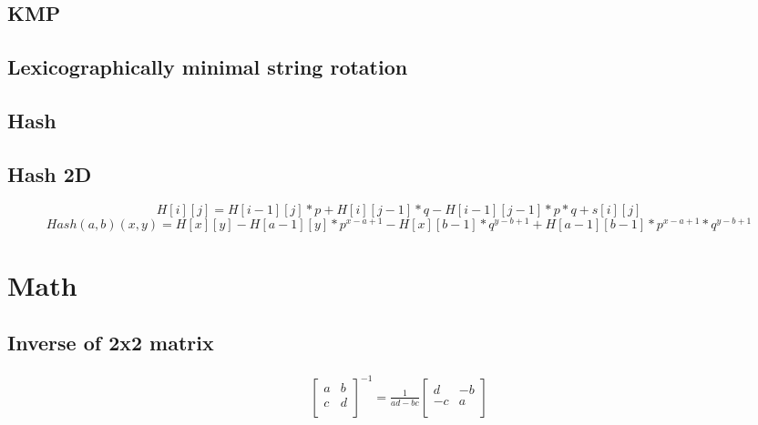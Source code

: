 \documentclass[a4paper, 12pt, oneside, landscape]{article}
\begin{document}
\begin{multicols}{2}
	\subsection{KMP}
	
	
	\subsection{Lexicographically minimal string rotation}
	
	
	\subsection{Hash}
	
	
	\subsection{Hash 2D}
	\begin{dmath}
	H[i][j] = H[i - 1][j] * p + H[i][j - 1] * q - H[i - 1][j - 1] * p * q + s[i][j]
	\end{dmath}
	\begin{dmath}
	Hash(a,b)(x,y) = H[x][y] - H[a - 1][y]*p^{x - a + 1} - H[x][b - 1]*q^{y - b + 1} + H[a - 1][b - 1] * p^{x - a + 1} * q^{y - b + 1}
	\end{dmath}

\section{Math}	
    \subsection{Inverse of 2x2 matrix}
    \begin{align*}
        \begin{bmatrix}
        a & b \\
        c & d \\
        \end{bmatrix} ^ {-1} = \frac{1}{ad - bc}
        \begin{bmatrix}
            d & -b \\
            -c & a \\
        \end{bmatrix}
    \end{align*}
    

\end{multicols}
\end{document}
